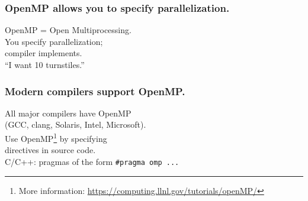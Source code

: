 \begin{frame}[containsverbatim]
  \frametitle{OpenMP allows you to specify parallelization.}

\vspace*{-3em}  
\Large
\begin{changemargin}{1.5cm}
    OpenMP = Open Multiprocessing.\\[2em]
    You specify parallelization; \\
    \hspace*{4em} compiler implements.\\[1em]
    ``I want 10 turnstiles.''
\end{changemargin}

\end{frame}

\begin{frame}[containsverbatim]
  \frametitle{Modern compilers support OpenMP.}
\vspace*{-3em}
\Large
\begin{changemargin}{1.5cm}
    All major compilers have OpenMP \\
    \qquad (GCC, clang, Solaris,
      Intel, Microsoft).\\[1em]

  Use OpenMP\footnote{More information:
    \url{https://computing.llnl.gov/tutorials/openMP/}} by specifying\\
  \hspace*{4em} directives in source code. \\[1em]
  C/C++: pragmas of the
  form \verb+#pragma omp ...+
\end{changemargin}
\end{frame}

